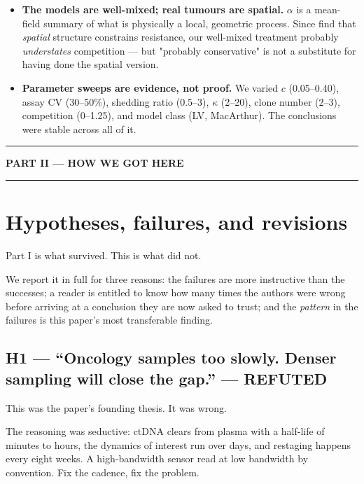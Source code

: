 \documentclass[11pt,a4paper]{article}
\begin{document}
\begin{itemize}[leftmargin=1.4em,itemsep=0.35em]
\emph{false positive} for identifiability. We tested discrete truths at $k = 2$ and
$k = 3$; a single, extreme, isolated resistant phenotype is a case we did not test.
\item \textbf{The models are well-mixed; real tumours are spatial.} $\alpha$ is a
mean-field summary of what is physically a local, geometric process. Since
\citet{bacevic2017spatial} find that \emph{spatial} structure constrains resistance,
our well-mixed treatment probably \emph{understates} competition --- but "probably
conservative" is not a substitute for having done the spatial version.
\item \textbf{Parameter sweeps are evidence, not proof.} We varied $c$
(0.05--0.40), assay CV (30--50\%), shedding ratio (0.5--3), $\kappa$ (2--20), clone
number (2--3), competition (0--1.25), and model class (LV, MacArthur). The
conclusions were stable across all of it.
\end{itemize}

\clearpage
\hrule
\vspace{0.6em}
\begin{center}\large\bfseries PART II --- HOW WE GOT HERE\end{center}
\vspace{0.2em}
\hrule

\section{Hypotheses, failures, and revisions}\label{sec:errata}

Part I is what survived. This is what did not.

We report it in full for three reasons: the failures are more instructive than the
successes; a reader is entitled to know how many times the authors were wrong before
arriving at a conclusion they are now asked to trust; and the \emph{pattern} in the
failures is this paper's most transferable finding.

\subsection*{H1 --- ``Oncology samples too slowly. Denser sampling will close the gap.'' --- \textcolor{red!60!black}{REFUTED}}

This was the paper's founding thesis. It was wrong.

The reasoning was seductive: ctDNA clears from plasma with a half-life of minutes to
hours, the dynamics of interest run over days, and restaging happens every eight
weeks. A high-bandwidth sensor read at low bandwidth by convention. Fix the cadence,
fix the problem.
\end{document}
